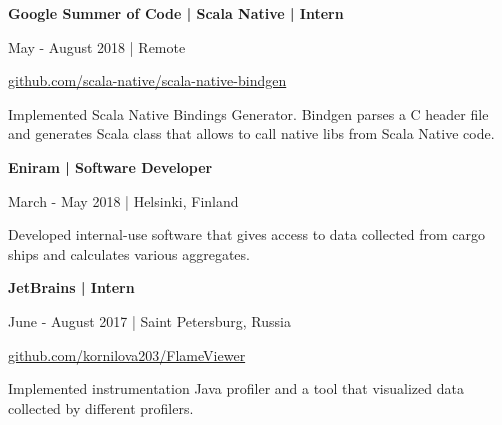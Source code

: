 \documentclass[9pt]{article}
\begin{document}
\begin{multicols}{2}
\vspace{1em}

{\textbf{Google Summer of Code | Scala Native | Intern}}

\color{gray} May - August 2018 | Remote \color{black}

\href{https://github.com/scala-native/scala-native-bindgen}{github.com/scala-native/scala-native-bindgen}

\vspace{0.3em}

Implemented Scala Native Bindings Generator.
Bindgen parses a C header file and generates Scala class that allows to call native libs from Scala Native code.

\vspace{1.5em}

{\textbf{Eniram | Software Developer}}

\color{gray} March - May 2018 | Helsinki, Finland \color{black}

\vspace{0.3em}

Developed internal-use software that gives access to data collected from cargo ships and calculates various aggregates.

\vspace{1.5em}

{\textbf{JetBrains | Intern}}

\color{gray} June - August 2017 | Saint Petersburg, Russia \color{black}

\href{https://github.com/kornilova203/FlameViewer}{github.com/kornilova203/FlameViewer}

\vspace{0.3em}

Implemented instrumentation Java profiler and a tool that visualized data collected by different profilers.


\end{multicols}
\end{document}
